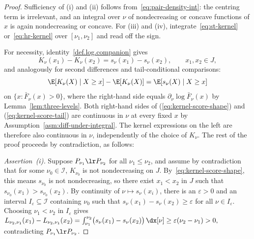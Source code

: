 \documentclass[11pt]{article}
\begin{document}
\begin{proof}
Sufficiency of \textup{(i)} and \textup{(ii)} follows from~\eqref{eq:pair-density-int}: the centring term is irrelevant, and an integral over \(\nu\) of nondecreasing or concave functions of \(x\) is again nondecreasing or concave. For \textup{(iii)} and \textup{(iv)}, integrate~\eqref{eq:st-kernel} or~\eqref{eq:hr-kernel} over $[\nu_1,\nu_2]$ and read off the sign.

For necessity,  identity~\eqref{def.log.companion} gives
\begin{equation}
\label{eq:kernel-score-shape}
K_\nu(x_1)-K_\nu(x_2)=s_\nu(x_1)-s_\nu(x_2),\qquad x_1,x_2\in J,
\end{equation}
and analogously for second differences and tail-conditional comparisons:
\begin{equation}
\label{eq:kernel-score-tail}
\E[K_\nu(X)\mid X\ge x]-\E[K_\nu(X)] =\E[s_\nu(X)\mid X\ge x]
\end{equation}
on \(\{x:\bar F_\nu(x)>0\}\), where the right-hand side equals \(\partial_\nu\log\bar F_\nu(x)\) by Lemma~\ref{lem:three-levels}. Both right-hand sides of (\ref{eq:kernel-score-shape}) and (\ref{eq:kernel-score-tail}) are continuous in \(\nu\) at every fixed \(x\) by Assumption~\ref{asm:diff-under-integral}. The kernel expressions on the left are therefore also continuous in \(\nu\), independently of the choice of $K_\nu$. The rest of the proof proceeds by contradiction, as follows:

\emph{Assertion~\textup{(i)}.} Suppose \(P_{\nu_1}\lr P_{\nu_2}\) for all \(\nu_1\le\nu_2\), and assume by contradiction that for some \(\nu_0 \in \mathcal I\), \(K_{\nu_0}\) is not nondecreasing on \(J\). By~\eqref{eq:kernel-score-shape}, this means $s_{\nu_0}$ is not nondecreasing, so there exist \(x_1<x_2\) in \(J\) such that \(s_{\nu_0}(x_1)>s_{\nu_0}(x_2)\). By continuity of $\nu\mapsto s_\nu(x_i)$, there is an \(\varepsilon>0\) and an interval $I_\varepsilon\subseteq\mathcal I$ containing $\nu_0$ such that $s_\nu(x_1)-s_\nu(x_2)\ge\varepsilon$ for all $\nu\in I_\varepsilon$. Choosing \(\nu_1<\nu_2\) in \(I_\varepsilon\) gives $L_{\nu_2,\nu_1}(x_1)-L_{\nu_2,\nu_1}(x_2)
=\int_{\nu_1}^{\nu_2}\bigl(s_\nu(x_1)-s_\nu(x_2)\bigr)\,\dx[\nu]
\ge \varepsilon(\nu_2-\nu_1)>0,
$
contradicting \(P_{\nu_1}\lr P_{\nu_2}\).


\end{proof}
\end{document}
